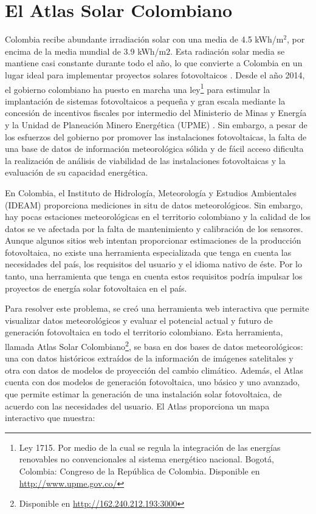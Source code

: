 \section{El Atlas Solar Colombiano}
Colombia recibe abundante irradiación solar con una media de 4.5 kWh/m$^2$, por encima de la media mundial de 3.9 kWh/m$2$. Esta radiación solar media se 
mantiene casi constante durante todo el año, lo que convierte a Colombia en un lugar ideal para implementar proyectos solares fotovoltaicos
\cite{abril_study_2021}. Desde el año 2014, el gobierno colombiano ha puesto en marcha una ley\footnote{Ley 1715. Por medio de la cual se regula la 
integración de las energías renovables no convencionales al sistema energético nacional. Bogotá, Colombia: Congreso de la República de Colombia. Disponible en 
\url{http://www.upme.gov.co/}} para estimular la implantación de sistemas fotovoltaicos a pequeña y gran escala mediante la concesión de incentivos fiscales por 
intermedio del Ministerio de Minas y Energía y la Unidad de Planeación Minero Energética (UPME) . Sin embargo, a pesar de los esfuerzos del gobierno por 
promover las instalaciones fotovoltaicas, la falta de una base de datos de 
información meteorológica sólida y de fácil acceso dificulta la realización de análisis de viabilidad de las instalaciones fotovoltaicas y la evaluación de su 
capacidad energética. 

En Colombia, el Instituto de Hidrología, Meteorología y Estudios Ambientales (IDEAM) proporciona mediciones in situ de datos meteorológicos. Sin embargo, hay 
pocas estaciones meteorológicas en el territorio colombiano y la calidad de los datos se ve afectada por la falta de mantenimiento y calibración de los 
sensores. Aunque algunos sitios web intentan proporcionar estimaciones de la producción fotovoltaica, no existe una herramienta especializada que tenga en 
cuenta las necesidades del país, los requisitos del usuario y el idioma nativo de éste. Por lo tanto, una herramienta que tenga en cuenta estos requisitos 
podría impulsar los proyectos de energía solar fotovoltaica en el país.

Para resolver este problema, se creó una herramienta web interactiva que permite visualizar datos meteorológicos y evaluar el potencial actual y futuro de 
generación fotovoltaica en todo el territorio colombiano. Esta herramienta, llamada Atlas Solar 
Colombiano\footnote{Disponible en \url{http://162.240.212.193:3000}}, se basa en dos 
bases de datos meteorológicos: una con datos históricos extraídos de la información de imágenes satelitales y otra con datos de modelos de proyección del 
cambio climático. Además, el Atlas cuenta con dos modelos de generación fotovoltaica, uno básico y uno avanzado, que permite estimar la generación de una 
instalación solar fotovoltaica, de acuerdo con las necesidades del usuario. El Atlas proporciona un mapa interactivo que muestra:

